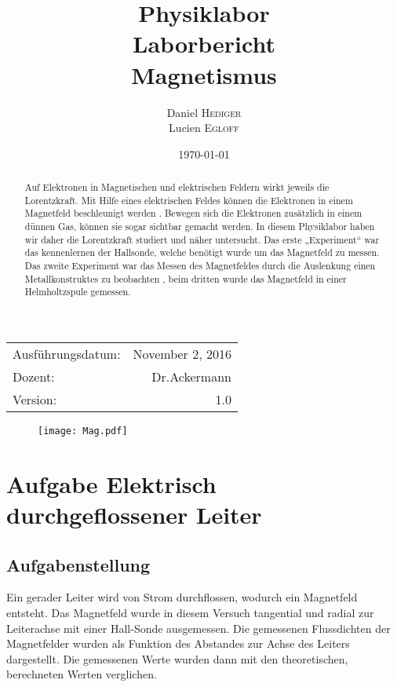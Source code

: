 \documentclass{article}
\title{Physiklabor \\ Laborbericht \\ Magnetismus} %
\author{Daniel \textsc{Hediger} \\ Lucien \textsc{Egloff}} %
\date{\today} %
\begin{document}
\maketitle %

\begin{center}
\begin{tabular}{l r}
	Ausführungsdatum: & November 2, 2016 \\ %
	Dozent: & Dr.Ackermann \\%
	Version: & 1.0
	
\end{tabular}
\end{center}
\begin{figure}[H]
	\centering
	\texttt{[image: Mag.pdf]} 
\end{figure}
\newpage
\tableofcontents 

\newpage
\begin{abstract}
	Auf Elektronen in Magnetischen und elektrischen Feldern wirkt jeweils die Lorentzkraft. Mit Hilfe eines elektrischen Feldes können die Elektronen in einem Magnetfeld beschleunigt werden
	. Bewegen sich die Elektronen zusätzlich in einem dünnen Gas, können sie sogar sichtbar gemacht werden.
	In diesem Physiklabor haben wir daher die Lorentzkraft studiert und näher untersucht.  Das erste „Experiment“ war das kennenlernen der Hallsonde, welche benötigt wurde um das Magnetfeld zu messen.
	Das zweite Experiment war das Messen des Magnetfeldes durch die Auslenkung einen Metallkonstruktes zu beobachten , beim dritten 
	wurde das Magnetfeld in einer Helmholtzspule gemessen.
\end{abstract}

\newpage
\section{Aufgabe Elektrisch durchgeflossener Leiter}
\subsection{Aufgabenstellung}
Ein gerader Leiter wird von Strom durchflossen, wodurch ein Magnetfeld entsteht. Das Magnetfeld
wurde in diesem Versuch tangential und radial zur Leiterachse mit einer Hall-Sonde ausgemessen.
Die gemessenen Flussdichten der Magnetfelder wurden als Funktion des Abstandes zur Achse des
Leiters dargestellt. Die gemessenen Werte wurden dann mit den theoretischen, berechneten Werten
verglichen.
\end{document}
